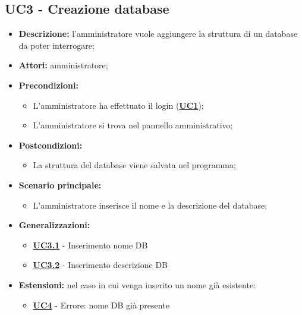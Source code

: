 \documentclass[5pt]{article}
\begin{document}
\subsection{UC3 - Creazione database}
\label{sec:UC3}
\begin{itemize}
	\item \textbf{Descrizione:} l’amministratore vuole aggiungere la struttura di un database da poter interrogare;
	\item \textbf{Attori:} amministratore;
	\item \textbf{Precondizioni:} 
	\begin{itemize}
		\item L’amministratore ha effettuato il login (\hyperref[sec:UC1]{\textbf{UC1}});
		\item L’amministratore si trova nel pannello amministrativo;
	\end{itemize}
	\item \textbf{Postcondizioni:} 
	\begin{itemize}
		\item La struttura del database viene salvata nel programma;
	\end{itemize}
	\item \textbf{Scenario principale:} 
	\begin{itemize}
		\item L’amministratore inserisce il nome e la descrizione del database;
	\end{itemize}
	\item \textbf{Generalizzazioni:} 
	\begin{itemize}
		\item \hyperref[sec:UC3.1]{\textbf{UC3.1}} - Inserimento nome DB
		\item \hyperref[sec:UC3.2]{\textbf{UC3.2}} - Inserimento descrizione DB
	\end{itemize}
	\item \textbf{Estensioni:} nel caso in cui venga inserito un nome già esistente:
	\begin{itemize}
		\item \hyperref[sec:UC4]{\textbf{UC4}} - Errore: nome DB già presente
	\end{itemize}
\end{itemize}
\end{document}
